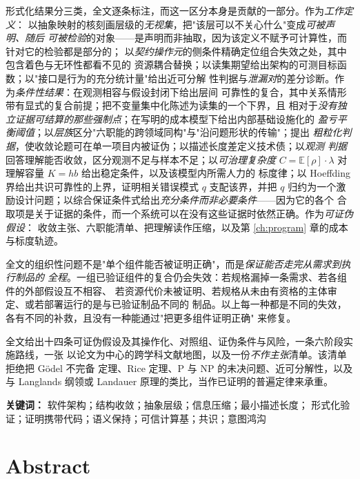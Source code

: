 \documentclass[UTF8,a4paper,11pt,openany,oneside]{ctexbook}
\begin{document}
形式化结果分三类，全文逐条标注，而这一区分本身是贡献的一部分。作为\emph{工作定义}：
以抽象映射的核刻画层级的\emph{无视集}，把"该层可以不关心什么"变成\emph{可被声明、随后
可被检验}的对象——是声明而非抽取，因为该定义不赋予可计算性，而针对它的检验都是部分的；
以\emph{契约操作元}的侧条件精确定位组合失效之处，其中包含着色与无环性都看不见的
资源耦合替换；以读集期望给出架构的可测目标函数；以"接口是行为的充分统计量"给出近可分解
性判据与\emph{泄漏对}的差分诊断。作为\emph{条件性结果}：在观测相容与假设封闭下给出层间
可靠性的复合，其中关系情形带有显式的复合前提；把不变量集中化陈述为读集的一个下界，且
相对于\emph{没有独立证据可结算的那些强制点}；在写明的成本模型下给出内部基础设施化的
\emph{盈亏平衡阈值}；以\emph{层族}区分"六职能的跨领域同构"与"沿问题形状的传输"；提出
\emph{粗粒化判据}，使收敛论题可在单一项目内被证伪；以描述长度差定义技术债；以\emph{观测
判据}回答理解能否收敛，区分观测不足与样本不足；以\emph{可治理复杂度}
$C=\mathbb{E}[\rho]\cdot\lambda$ 对理解容量 $K=hb$ 给出稳定条件，以及该模型内所需人力的
标度律；以 Hoeffding 界给出共识可靠性的上界，证明相关错误模式 $q$ 支配该界，并把 $q$
归约为一个激励设计问题；以综合保证条件式给出\emph{充分条件而非必要条件}——因为它的各个
合取项是关于证据的条件，而一个系统可以在没有这些证据时依然正确。作为\emph{可证伪假设}：
收敛主张、六职能清单、把理解读作压缩，以及第 \ref{ch:program} 章的成本与标度轨迹。

全文的组织性问题不是"单个组件能否被证明正确"，而是\emph{保证能否走完从需求到执行制品的
全程}。一组已验证组件的复合仍会失效：若规格漏掉一条需求、若各组件的外部假设互不相容、
若资源代价未被证明、若规格从未由有资格的主体审定、或若部署运行的是与已验证制品不同的
制品。以上每一种都是不同的失效，各有不同的补救，且没有一种能通过"把更多组件证明正确"
来修复。

全文给出十四条可证伪假设及其操作化、对照组、证伪条件与风险，一条六阶段实施路线，一张
以论文为中心的跨学科文献地图，以及一份\emph{不作主张}清单。该清单拒绝把 Gödel 不完备
定理、Rice 定理、$\mathrm{P}$ 与 $\mathrm{NP}$ 的未决问题、近可分解性，以及与
Langlands 纲领或 Landauer 原理的类比，当作已证明的普遍定律来承重。

\vspace{1em}
\noindent\textbf{关键词：} 软件架构；结构收敛；抽象层级；信息压缩；最小描述长度；
形式化验证；证明携带代码；语义保持；可信计算基；共识；意图鸿沟

\chapter*{Abstract}
\end{document}
